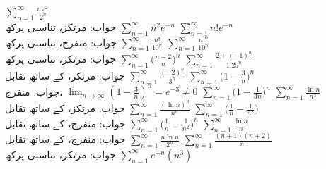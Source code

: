$\sum\limits_{n=1}^{\infty}\frac{n^{\sqrt{2}}}{2^n}$\\
جواب:\quad
مرتکز، تناسبی پرکھ
$\sum\limits_{n=1}^{\infty}n^2e^{-n}$
$\sum\limits_{n=1}^{\infty}n!e^{-n}$\\
جواب:\quad
منفرج، تناسبی پرکھ
$\sum\limits_{n=1}^{\infty}\frac{n!}{10^n}$
$\sum\limits_{n=1}^{\infty}\frac{n^{10}}{10^n}$\\
جواب:\quad
مرتکز، تناسبی پرکھ
$\sum\limits_{n=1}^{\infty}\big(\frac{n-2}{n}\big)^n$
$\sum\limits_{n=1}^{\infty}\frac{2+(-1)^n}{1.25^n}$\\
جواب:\quad
مرتکز،  کے ساتھ تقابل
$\sum\limits_{n=1}^{\infty}\frac{(-2)^n}{3^n}$
$\sum\limits_{n=1}^{\infty}\big(1-\frac{3}{n}\big)^n$\\
جواب:\quad
منفرج، 
$\lim_{n\to\infty}(1-\tfrac{3}{n})^n=e^{-3}\ne 0$
$\sum\limits_{n=1}^{\infty}\big(1-\frac{1}{3n}\big)^n$
$\sum\limits_{n=1}^{\infty}\frac{\ln n}{n^3}$\\
جواب:\quad
مرتکز،  کے ساتھ تقابل
$\sum\limits_{n=1}^{\infty}\frac{(\ln n)^n}{n^n}$
$\sum\limits_{n=1}^{\infty}\big(\frac{1}{n}-\frac{1}{n^2}\big)$\\
جواب:\quad
منفرج،  کے ساتھ تقابل
$\sum\limits_{n=1}^{\infty}\big(\frac{1}{n}-\frac{1}{n^2}\big)^n$
$\sum\limits_{n=1}^{\infty}\frac{\ln n}{n}$\\
جواب:\quad
منفرج،  کے ساتھ تقابل
$\sum\limits_{n=1}^{\infty}\frac{n\ln n}{2^n}$
$\sum\limits_{n=1}^{\infty}\frac{(n+1)(n+2)}{n!}$\\
جواب:\quad
مرتکز، تناسبی پرکھ
$\sum\limits_{n=1}^{\infty}e^{-n}(n^3)$
